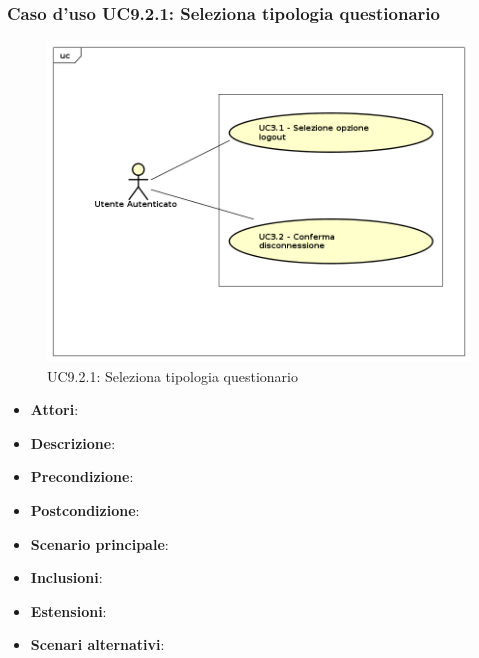 		\subsubsection{Caso d'uso UC9.2.1: Seleziona tipologia questionario}
		\label{UC9.2.1}
		\begin{figure}[h]
			\centering
		\includegraphics[scale=0.7,keepaspectratio]{UML/UC9.png}
			\caption{UC9.2.1: Seleziona tipologia questionario}
		\end{figure}
		\FloatBarrier
		\begin{itemize}
			\item \textbf{Attori}: 
			\item \textbf{Descrizione}: 
			\item \textbf{Precondizione}: 
			\item \textbf{Postcondizione}: 
			\item \textbf{Scenario principale}:
			\item \textbf{Inclusioni}:
			\item \textbf{Estensioni}:
			\item \textbf{Scenari alternativi}:
		\end{itemize}
		

